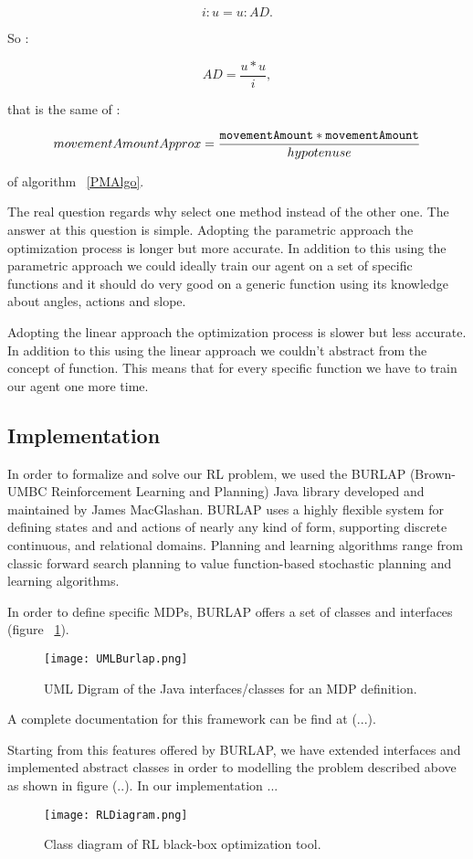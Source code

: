\begin{equation}
	i : u =  u : AD.
\end{equation}

So :

\begin{equation}
	AD = \dfrac{u * u}{i},
\end{equation}

that is the same of :

\begin{equation}
	 movementAmountApprox = \dfrac{{\tt movementAmount} * {\tt movementAmount}}{hypotenuse}
\end{equation}

of algorithm ~\ref{PMAlgo}.

The real question regards why select one method instead of the other one. The answer at this question is simple. Adopting the parametric approach the optimization process is longer but more accurate. In addition to this using the parametric approach we could ideally train our agent on a set of specific functions and it should do very good on a generic function using its knowledge about angles, actions and slope. 

Adopting the linear approach the optimization process is slower but less accurate. In addition to this using the linear approach we couldn't abstract from the concept of function.  This means that for every specific function we have to train our agent one more time.

\subsection{Implementation}

In order to formalize and solve our RL problem, we used the BURLAP (Brown-UMBC Reinforcement Learning and Planning) Java library developed and maintained by James MacGlashan. BURLAP uses a highly flexible system for defining states and and actions of nearly any kind of form, supporting discrete continuous, and relational domains. Planning and learning algorithms range from classic forward search planning to value function-based stochastic planning and learning algorithms.

In order to define specific MDPs, BURLAP offers a set of classes and interfaces (figure ~\ref{fig:UMLBurlap}).

\begin{figure} [h!]
	\texttt{[image: UMLBurlap.png]}
	\caption{UML Digram of the Java interfaces/classes for an MDP definition.}
	\label{fig:UMLBurlap}
\end{figure}

A complete documentation for this framework can be find at (...). 

Starting from this features offered by BURLAP, we have extended interfaces and implemented abstract classes in order to modelling the problem described above as shown in figure (..). In our implementation ...

\begin{figure} [h!]
	\texttt{[image: RLDiagram.png]}
	\caption{Class diagram of RL black-box optimization tool.}
	\label{fig:RLDiagram}
\end{figure}